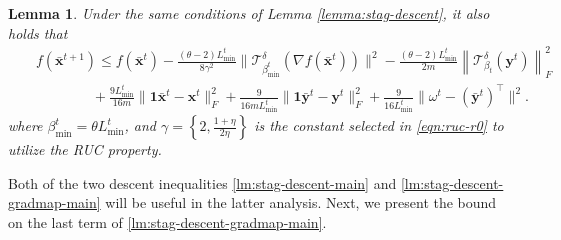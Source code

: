 \documentclass{article}
\newtheorem{lemma}[theorem]{Lemma}
\newcommand{\cT}{\mathcal{T}}
\newcommand{\ctdb}{\mathcal{T}^\delta_{\beta_t}}
\newcommand{\byt}{\mathbf{y}^t}
\newcommand{\bbxt}{\bar{\mathbf{x}}^t}
\newcommand{\bbxte}{\bar{\mathbf{x}}^{t+1}}
\newcommand{\bbyt}{\bar{\mathbf{y}}^t}
\newcommand{\bone}{\mathbf{1}}
\begin{document}
\begin{lemma}
\label{lemma:stag-descent-gradmap}
Under the same conditions of Lemma \ref{lemma:stag-descent}, it also holds that 
\begin{eqnarray} 
\label{lm:stag-descent-gradmap-main}
&& f(\bbxte)  \leq  f(\bbxt)  -  \frac{(\theta-2)L_{\min}^t}{8\gamma^2} \big\|\cT_{\beta_{\min}^t}^\delta(\nabla f(\bbxt))\big\|^2  -  \frac{(\theta-2)L_{\min}^t}{2m}\left\|\ctdb(\byt)\right\|_F^2\\
&& \qquad\qquad+ \frac{9L_{\min}^t}{16m}\|\mathbf{1}\bar{\mathbf{x}}^t-\mathbf{x}^t\|^2_F 
 + \frac{9}{16mL_{\min}^t}\|\bone\bbyt - \byt\|^2_F + \frac{9}{16L_{\min}^t}\|\omega^t-(\bbyt)^\top\|^2. \nonumber
\end{eqnarray} 
where $\beta_{\min}^{t}=\theta L_{\min}^t$, and $\gamma = \left\{2,\frac{1+\eta}{2\eta}\right\}$ is the constant selected in \eqref{eqn:ruc-r0} to utilize the RUC property.
\end{lemma} 
Both of the two descent inequalities \eqref{lm:stag-descent-main} and \eqref{lm:stag-descent-gradmap-main} will be useful in the latter analysis. Next, we present the bound on the last term of \eqref{lm:stag-descent-gradmap-main}. 
\end{document}
